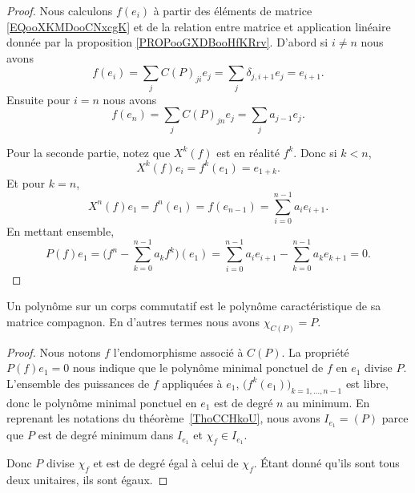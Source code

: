\begin{proof}
	Nous calculons \( f(e_i)\) à partir des éléments de matrice \eqref{EQooXKMDooCNxcgK} et de la relation entre matrice et application linéaire donnée par la proposition \ref{PROPooGXDBooHfKRrv}. D'abord si \( i\neq n\) nous avons
	\begin{equation}
		f(e_i)  =\sum_jC(P)_{ji}e_j
		=\sum_j\delta_{j,i+1}e_j
		=e_{i+1}.
	\end{equation}
	Ensuite pour \( i=n\) nous avons
	\begin{equation}
		f(e_n)=\sum_jC(P)_{jn}e_j=\sum_ja_{j-1}e_j.
	\end{equation}

	Pour la seconde partie, notez que \( X^k(f)\) est en réalité \( f^k\). Donc si \( k<n\),
	\begin{equation}
		X^k(f)e_i=f^k(e_1)=e_{1+k}.
	\end{equation}
	Et pour \( k=n\),
	\begin{equation}
		X^n(f)e_1=f^n(e_1)=f(e_{n-1})=\sum_{i=0}^{n-1}a_ie_{i+1}.
	\end{equation}
	En mettant ensemble,
	\begin{equation}
		P(f)e_1=\big( f^n-\sum_{k=0}^{n-1}a_kf^k \big)(e_1)=\sum_{i=0}^{n-1}a_ie_{i+1}-\sum_{k=0}^{n-1}a_ke_{k+1}=0.
	\end{equation}
\end{proof}

\begin{lemma} \label{LemkVNisk}
	Un polynôme sur un corps commutatif est le polynôme caractéristique de sa matrice compagnon. En d'autres termes nous avons \( \chi_{C(P)}=P\).
\end{lemma}

\begin{proof}
	Nous notons \( f\) l'endomorphisme associé à \( C(P)\). La propriété \( P(f)e_1=0\) nous indique que le polynôme minimal ponctuel de \( f\) en \( e_1\) divise \( P\). L'ensemble des puissances de \( f\) appliquées à \( e_1\), \( \big( f^k(e_1) \big)_{k=1,\ldots, n-1}\) est libre, donc le polynôme minimal ponctuel en \( e_1\) est de degré \( n\) au minimum. En reprenant les notations du théorème~\ref{ThoCCHkoU}, nous avons \( I_{e_1}=(P)\) parce que \( P\) est de degré minimum dans \( I_{e_1}\) et \( \chi_f\in I_{e_1}\).

	Donc \( P\) divise \( \chi_f\) et est de degré égal à celui de \( \chi_f\). Étant donné qu'ils sont tous deux unitaires, ils sont égaux.
\end{proof}

